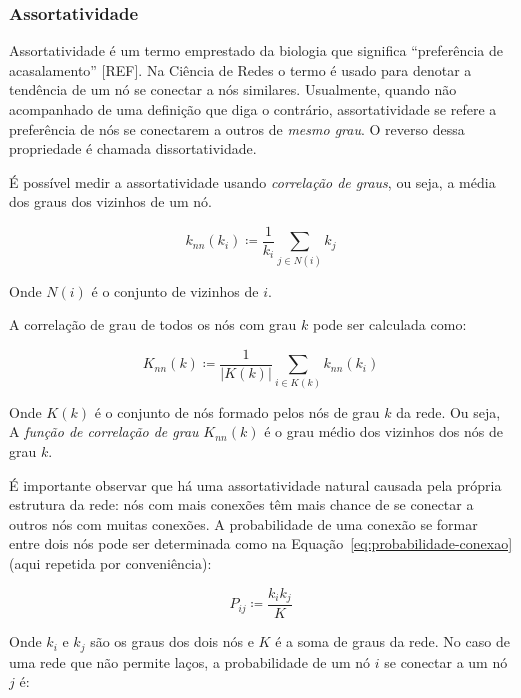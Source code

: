 \documentclass[12pt,a4paper]{article}
\theoremstyle{hypo}
\newcommand{\defn}{\coloneqq} %
\begin{document}
\subsubsection{Assortatividade} \label{sec:assortatividade}

Assortatividade é um termo emprestado da biologia que significa \enquote{preferência de acasalamento} [REF]. Na Ciência de Redes o termo é usado para denotar a tendência de um nó se conectar a nós similares. Usualmente, quando não acompanhado de uma definição que diga o contrário, assortatividade se refere a preferência de nós se conectarem a outros de \textit{mesmo grau}. O reverso dessa propriedade é chamada dissortatividade.

É possível medir a assortatividade usando \textit{correlação de graus}, ou seja, a média dos graus dos vizinhos de um nó.

\begin{equation}
k_\textit{nn}(k_i) \defn \frac{1}{k_i} \sum_{j \in N(i)} k_j
\end{equation}

Onde $N(i)$ é o conjunto de vizinhos de $i$.

A correlação de grau de todos os nós com grau $k$ pode ser calculada como:

\begin{equation}
K_\textit{nn}(k) \defn \frac{1}{|K(k)|} \sum_{i \in K(k)} k_\textit{nn}(k_i)
\end{equation}

Onde $K(k)$ é o conjunto de nós formado pelos nós de grau $k$ da rede. Ou seja, A \textit{função de correlação de grau} $K_\textit{nn}(k)$ é o grau médio dos vizinhos dos nós de grau $k$.

É importante observar que há uma assortatividade natural causada pela própria estrutura da rede: nós com mais conexões têm mais chance de se conectar a outros nós com muitas conexões. A probabilidade de uma conexão se formar entre dois nós pode ser determinada como na Equação~\ref{eq:probabilidade-conexao} (aqui repetida por conveniência):

\begin{equation} \label{eq:probabilidade-assortativa}
P_{ij} \defn \frac{k_i k_j}{K}
\end{equation}

Onde $k_i$ e $k_j$ são os graus dos dois nós e $K$ é a soma de graus da rede. No caso de uma rede que não permite laços, a probabilidade de um nó $i$ se conectar a um nó $j$ é:~
\end{document}
